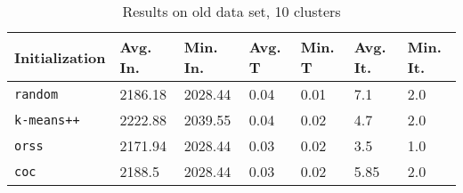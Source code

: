 \begin{table}[h]
	\begin{center}
		\begin{tabular}{|l|l|l|l|l|l|l|}
			\hline
			Initialization & Avg. In. & Min. In. & Avg. T & Min. T & Avg. It. & Min. It.\\\hline
			\texttt{random} & 2186.18 & 2028.44 & 0.04 & 0.01 & 7.1 & 2.0\\\hline
			\texttt{k-means++} & 2222.88 & 2039.55 & 0.04 & 0.02 & 4.7 & 2.0\\\hline
			\texttt{orss} & 2171.94 & 2028.44 & 0.03 & 0.02 & 3.5 & 1.0\\\hline
			\texttt{coc} & 2188.5 & 2028.44 & 0.03 & 0.02 & 5.85 & 2.0\\\hline
		\end{tabular}
		\caption{Results on old data set, 10 clusters}
		\label{tbl:old10}
	\end{center}
\end{table}

